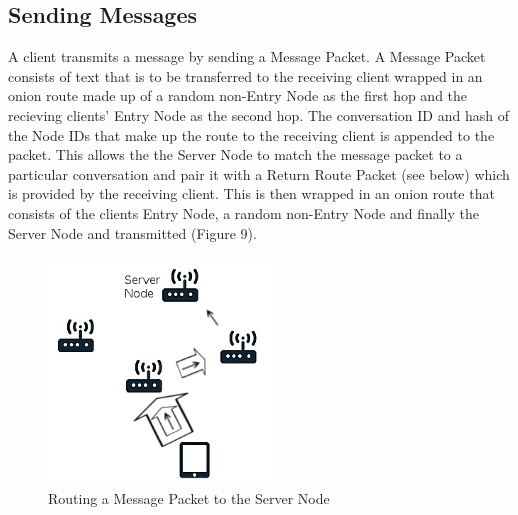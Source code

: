 \documentclass{article}
\begin{document}
\newpage

\subsection{Sending Messages}
A client transmits a message by sending a Message Packet. A Message Packet consists of text that is to be transferred to the receiving client wrapped 
in an onion route made up of a random non-Entry Node as the first hop and the recieving clients' Entry Node as the second hop. The conversation ID and 
hash of the Node IDs that make up the route to the receiving client is appended to the packet. This allows the the Server Node to match the message packet 
to a particular conversation and pair it with a Return Route Packet (see below) which is provided by the receiving client. This is then wrapped in an onion 
route that consists of the clients Entry Node, a random non-Entry Node and finally the Server Node and transmitted (Figure 9).
\begin{figure}[h]
	\centering
  	\includegraphics[width=6cm,height=6cm,keepaspectratio]{img/MessagePacket.png}
	\caption{Routing a Message Packet to the Server Node}
\end{figure}
\end{document}
